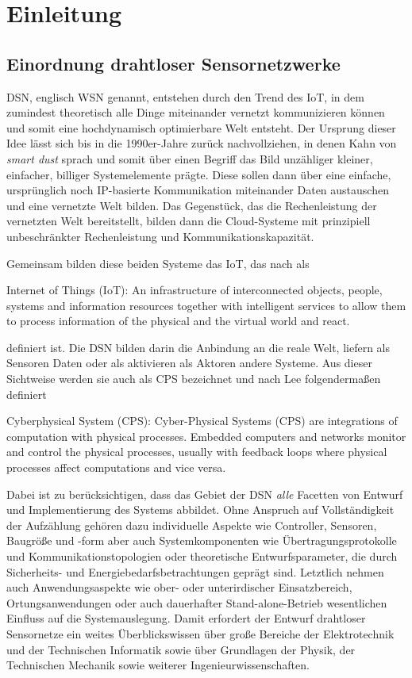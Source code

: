\thispagestyle{plain}
\chapter{Einleitung}
\section{Einordnung drahtloser Sensornetzwerke}

\ac{DSN}, englisch \ac{WSN} genannt, entstehen durch den Trend des \ac{IoT}, in dem zumindest theoretisch alle Dinge miteinander vernetzt kommunizieren können und somit eine hochdynamisch optimierbare Welt entsteht. Der Ursprung dieser Idee lässt sich bis in die 1990er-Jahre zurück nachvollziehen, in denen Kahn \parencite{Kahn1999} von \emph{smart dust} sprach und somit über einen Begriff das Bild unzähliger kleiner, einfacher, billiger Systemelemente prägte. Diese sollen dann über eine einfache, ursprünglich noch \ac{IP}-basierte Kommunikation miteinander Daten austauschen und eine vernetzte Welt bilden. Das Gegenstück, das die Rechenleistung der vernetzten Welt bereitstellt, bilden dann die Cloud-Systeme mit prinzipiell unbeschränkter Rechenleistung und Kommunikationskapazität.

Gemeinsam bilden diese beiden Systeme das \ac{IoT}, das nach \textcite{InternationalOrganizationforStandardization1997} als 

Internet of Things (IoT):
An infrastructure of interconnected objects, people, systems and information resources together with intelligent services to allow them to process information of the physical and the virtual world and react.

definiert ist. Die \ac{DSN} bilden darin die Anbindung an die reale Welt, liefern als Sensoren Daten oder als aktivieren als Aktoren andere Systeme. Aus dieser Sichtweise werden sie auch als \ac{CPS} bezeichnet und nach Lee \parencite{Lee2008} folgendermaßen definiert

Cyberphysical System (CPS): Cyber-Physical Systems (CPS) are integrations of computation with physical processes. Embedded computers and networks monitor and control the physical processes, usually with feedback loops where physical processes affect computations and vice versa.

Dabei ist zu berücksichtigen, dass das Gebiet der \ac{DSN} \emph{alle} Facetten von Entwurf und Implementierung des Systems abbildet. Ohne Anspruch auf Vollständigkeit der Aufzählung gehören dazu individuelle Aspekte wie Controller, Sensoren, Baugröße und -form aber auch Systemkomponenten wie Übertragungsprotokolle und Kommunikationstopologien oder theoretische Entwurfsparameter, die durch Sicherheits- und Energiebedarfsbetrachtungen geprägt sind. Letztlich nehmen auch Anwendungsaspekte wie ober- oder unterirdischer Einsatzbereich, Ortungsanwendungen oder auch dauerhafter Stand-alone-Betrieb wesentlichen Einfluss auf die Systemauslegung. Damit erfordert der Entwurf drahtloser Sensornetze ein weites Überblickswissen über große Bereiche der Elektrotechnik und der Technischen Informatik sowie über Grundlagen der Physik, der Technischen Mechanik sowie weiterer Ingenieurwissenschaften.  

